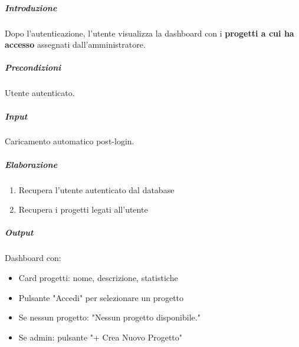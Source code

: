 \vspace{0.5cm}

\newpage


\begin{reqbox}[title=REQ-FUN-02: Visualizza Dashboard Progetti]
\label{subsubsec:req-dashboard-progetti}

\subparagraph{Introduzione}
Dopo l'autenticazione, l'utente visualizza la dashboard con i \textbf{progetti a cui ha accesso} assegnati dall'amministratore.

\subparagraph{Precondizioni}
Utente autenticato.

\subparagraph{Input}
Caricamento automatico post-login.

\subparagraph{Elaborazione}
\begin{enumerate}[leftmargin=1.1em]
\item Recupera l'utente autenticato dal database
\item Recupera i progetti legati all'utente
\end{enumerate}

\subparagraph{Output}
Dashboard con:
\begin{itemize}[leftmargin=1.1em]
\item Card progetti: nome, descrizione, statistiche
\item Pulsante "Accedi" per selezionare un progetto
\item Se nessun progetto: "Nessun progetto disponibile."
\item Se admin: pulsante "+ Crea Nuovo Progetto"
\end{itemize}

\end{reqbox}

\vspace{0.5cm}

\newpage


